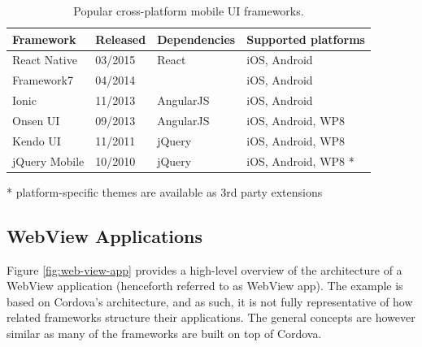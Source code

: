 \documentclass[thesis.tex]{subfiles}
\begin{document}
\begin{table}[hb]
	\caption{Popular cross-platform mobile UI frameworks.} \label{table:cross-platform-mobile-ui-frameworks}

	\begin{center}
	\begin{tabular}{| m{3.05cm} | m{1.75cm} | m{2.75cm} | m{4.25cm} |}

		\hline
		\textbf{Framework}	&	\textbf{Released}		&		\textbf{Dependencies}		&	\textbf{Supported platforms}		\\ \hline
		React Native		&	03/2015						&	React						&	iOS, Android						\\ \hline
		Framework7 			&	04/2014						&								&	iOS, Android						\\ \hline
		Ionic				&	11/2013						&	AngularJS					&	iOS, Android						\\ \hline
		Onsen UI			&	09/2013						&	AngularJS					&	iOS, Android, WP8					 \\ \hline
		Kendo UI			&	11/2011						&	jQuery						&	iOS, Android, WP8					\\ \hline
		jQuery Mobile 		&	10/2010						&	jQuery						&	iOS, Android, WP8 \footnotesize{*}	\\ \hline

	\end{tabular}
	\end{center}
	\vspace{-3mm}
	\scriptsize{*} \small{platform-specific themes are available as 3rd party extensions}
\end{table}

\subsection{WebView Applications}

Figure \ref{fig:web-view-app} provides a high-level overview of the architecture of a WebView application (henceforth referred to as WebView app). The example is based on Cordova's architecture, and as such, it is not fully representative of how related frameworks structure their applications. The general concepts are however similar as many of the frameworks are built on top of Cordova.
\end{document}
